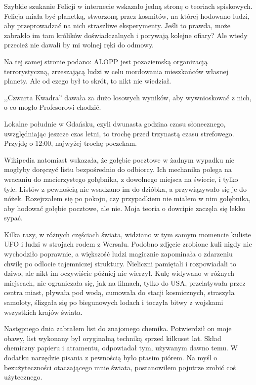Szybkie szukanie Felicji w internecie wskazało jedną stronę o teoriach spiskowych.
Felicja miała być planetką, stworzoną przez kosmitów, na której hodowano ludzi, aby przeprowadzać na nich straszliwe eksperymenty.
Jeśli to prawda, może zabrakło im tam królików doświadczalnych i porywają kolejne ofiary?
Ale wtedy przecież nie dawali by mi wolnej ręki do odmowy.

Na tej samej stronie podano: ALOPP jest pozaziemską organizacją terrorystyczną, zrzeszającą ludzi w celu mordowania mieszkańców własnej planety.
Ale od czego był to skrót, to nikt nie wiedział.

,,Czwarta Kwadra'' dawała za dużo losowych wyników, aby wywnioskować z nich, o co mogło Profesorowi chodzić.

Lokalne południe w Gdańsku, czyli dwunasta godzina czasu słonecznego, uwzględniając jeszcze czas letni, to trochę przed trzynastą czasu strefowego.
Przyjdę o 12:00, najwyżej trochę poczekam.

Wikipedia natomiast wskazała, że gołębie pocztowe w żadnym wypadku nie mogłyby doręczyć listu bezpośrednio do odbiorcy.
Ich mechanika polega na wracaniu do macierzystego gołębnika, z dowolnego miejsca na świecie, i tylko tyle.
Listów z pewnością nie wsadzano im do dzióbka, a przywiązywało się je do nóżek.
Rozejrzałem się po pokoju, czy przypadkiem nie miałem w nim gołębnika, aby hodować gołębie pocztowe, ale nie.
Moja teoria o dowcipie zaczęła się lekko sypać.

Kilka razy, w różnych częściach świata, widziano w tym samym momencie kuliste UFO i ludzi w strojach rodem z Wersalu.
Podobno zdjęcie zrobione kuli nigdy nie wychodziło poprawnie, a większość ludzi magicznie zapominała o zdarzeniu chwilę po odlocie tajemniczej struktury.
Nieliczni pamiętali i rozpowiadali to dziwo, ale nikt im oczywiście później nie wierzył.
Kulę widywano w różnych miejscach, nie ograniczała się, jak na filmach, tylko do USA, przelatywała przez centra miast, pływała pod wodą, cumowała do stacji kosmicznych, straszyła samoloty, ślizgała się po biegunowych lodach i toczyła bitwy z wojskami wszystkich krajów świata.

Następnego dnia zabrałem list do znajomego chemika.
Potwierdził on moje obawy, list wykonany był oryginalną techniką sprzed kilkuset lat.
Skład chemiczny papieru i atramentu, odpowiadał tym, używanym dawno temu.
W dodatku narzędzie pisania z pewnością było ptasim piórem.
Na myśl o bezużyteczności otaczającego mnie świata, postanowiłem pojutrze zrobić coś użytecznego.

